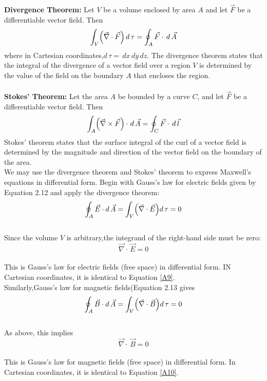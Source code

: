 \documentclass[12pt]{article}
\numberwithin{equation}{section}
\begin{document}
\textbf{Divergence Theorem:} Let $V$ be a volume enclosed by area $A$ and let $\vec{F}$ be a differentiable
vector field. Then 
\begin{equation}
    \int_V \Bigl(\vec{\nabla}\cdot\vec{F}\Bigl)\,d\,\tau=\oint_A \vec{F}\cdot\,d\,\vec{A}
\end{equation}
where in Cartesian coordinates,$d\,\tau=\,dx\,dy\,dz$. The divergence theorem states that the integral of the divergence of a vector field over a region $V$ is determined by the value of the field on the boundary $A$ that encloses the region.\\
\\
\textbf{Stokes' Theorem:} Let the area $A$ be bounded by a curve $C$, and let $\vec{F}$ be a differentiable vector field. Then
\begin{equation}
    \int_A \Bigl(\vec{\nabla}\times\vec{F}\Bigl)\,\cdot\,\,d\,\vec{A}=\oint_C \vec{F}\cdot\,d\,\vec{l}
\end{equation}
Stokes' theorem states that the surface integral of the curl of a vector field is determined by
the magnitude and direction of the vector field on the boundary of the area.\\
\indent We may use the divergence theorem and Stokes' theorem to express Maxwell's equations in differential form.
Begin with Gauss's law for electric fields given by Equation 2.12 and apply the divergence theorem:
\[
    \oint_A \vec{E}\cdot d\,\vec{A}=\int_V \Bigl(\vec{\nabla}\cdot\vec{E}\Bigl)d\,\tau=0
\]
\\
Since the volume $V$ is arbitrary,the integrand of the right-hand side must be zero:
\begin{equation}
    \vec{\nabla}\cdot \,\vec{E}=0
\end{equation}
\\
This is Gauss's law for electric fields (free space) in differential form. IN Cartesian coordinates, it is identical to Equation \eqref{A9}.\\
\indent Similarly,Gauss's law for magnetic fields(Equation 2.13 gives
\[
    \oint_A \vec{B}\cdot d\,\vec{A}=\int_V \Bigl(\vec{\nabla}\cdot\vec{B}\Bigl)d\,\tau=0
\]
\\
As above, this implies
\\
\begin{equation}
    \vec{\nabla}\cdot \,\vec{B}=0
\end{equation}
\\
This is Gauss's law for magnetic fields (free space) in differential form. In Cartesian coordinates, it is identical to Equation \eqref{A10}.\\
\end{document}
